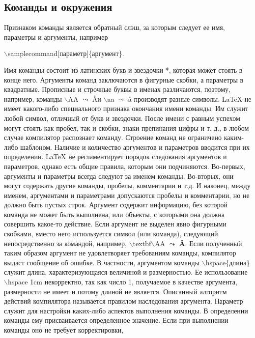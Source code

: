 \documentclass[a4paper, 14pt]{extarticle}
\begin{document}
	\subsection*{Команды и окружения}
	Признаком команды является обратный слэш, за которым следует ее имя, параметры и аргументы, например
	\begin{center}
		$\backslash$samplecommand[параметр]\{аргумент\}.
	\end{center}
	Имя команды состоит из латинских букв и звездочки *, которая
	может стоять в конце него. Аргументы команд заключаются в фигурные
	скобки, а параметры в квадратные. Прописные и строчные буквы в
	именах различаются, поэтому, например, команды $\backslash$AA $\leadsto$ \AA и $\backslash$aa $\leadsto$ \aa
	производят разные символы.
	\LaTeX{} не имеет какого-либо специального признака окончания имени
	команды. Им служит любой символ, отличный от букв и звездочки.
	После имени с равным успехом могут стоять как пробел, так и скобки,
	знаки препинания цифры и т. д., в любом случае компилятор распознает
	команду.
	Строение команд не ограничено каким-либо шаблоном. Наличие
	и количество аргументов и параметров вводится при их определении.
	\LaTeX{} не регламентирует порядок следования аргументов и параметров,
	однако есть общие правила, которым они подчиняются. Во-первых,
	аргументы и параметры всегда следуют за именем команды. Во-вторых,
	они могут содержать другие команды, пробелы, комментарии и т.д.
	И наконец, между именем, аргументами и параметрами допускаются
	пробелы и комментарии, но не должно быть пустых строк.
	Аргумент содержит информацию, без которой команда не может
	быть выполнена, или объекты, с которыми она должна совершить
	какое-то действие. Если аргумент не выделен явно фигурными скобками, вместо него используется символ (или команда), следующий
	непосредственно за командой, например, $\backslash$textbf$\backslash$AA $\leadsto$ \textbf\AA. Если полученный таким образом аргумент не удовлетворяет требованиям команды, компилятор выдаст сообщение об ошибке. В частности, аргументом
	команды $\backslash$hspace\{длина\} служит длина, характеризующаяся величиной и размерностью. Ее использование $\backslash$hspace 1cm некорректно, так
	как число 1, получаемое в качестве аргумента, размерности не имеет и
	потому длиной не является.
	Описанный алгоритм действий компилятора называется правилом
	наследования аргумента.
	Параметр служит для настройки каких-либо аспектов выполнения
	команды. В определении команды ему присваивается определенное
	значение. Если при выполнении команды оно не требует корректировки,
\end{document}
